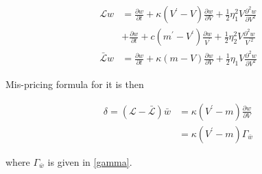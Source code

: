 \begin{equation}\label{inf gen2}
    \begin{aligned}
        \mathcal{L} w&= \frac{\partial w}{\partial t}+\kappa(V^{\prime} - V) \frac{\partial w}{\partial V}+\frac{1}{2} \eta_1^{2} V \frac{\partial^{2} w}{\partial V^{2}} \\
        &+ \frac{\partial w}{\partial t}+c(m^{\prime} - V^{\prime}) \frac{\partial w}{V^{\prime}}+\frac{1}{2} \eta_2^{2} V \frac{\partial^{2} w}{V^{\prime 2}}\\
        \bar{\mathcal{L}} w &= \frac{\partial w}{\partial t}+\kappa(m - V) \frac{\partial w}{\partial V}+\frac{1}{2} \eta_1 V \frac{\partial^{2} w}{\partial V^{2}}
    \end{aligned}
\end{equation}

\noindent Mis-pricing formula for it is then

$$
\begin{aligned}
    \delta = (\mathcal{L} - \bar{\mathcal{L}}) \bar{w} &= \kappa(V^{\prime}-m)\frac{\partial w}{\partial V} \\
    &= \kappa(V^{\prime}-m) \Gamma_{\bar{w}}
\end{aligned}
$$

\noindent where $\Gamma_{\bar{w}}$ is given in \eqref{gamma}.